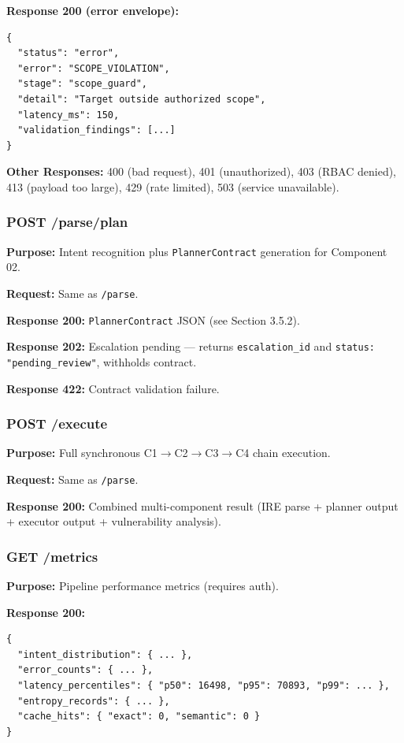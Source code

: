 ﻿\documentclass[10pt,journal,onecolumn]{IEEEtran}
\begin{document}
\textbf{Response 200 (error envelope):}
\begin{lstlisting}
{
  "status": "error",
  "error": "SCOPE_VIOLATION",
  "stage": "scope_guard",
  "detail": "Target outside authorized scope",
  "latency_ms": 150,
  "validation_findings": [...]
}
\end{lstlisting}

\textbf{Other Responses:} 400 (bad request), 401 (unauthorized), 403 (RBAC denied), 413 (payload too large), 429 (rate limited), 503 (service unavailable).

\subsubsection{POST /parse/plan}
\textbf{Purpose:} Intent recognition plus \texttt{PlannerContract} generation for Component 02.

\textbf{Request:} Same as \texttt{/parse}.

\textbf{Response 200:} \texttt{PlannerContract} JSON (see Section 3.5.2).

\textbf{Response 202:} Escalation pending --- returns \texttt{escalation\_id} and \texttt{status: "pending\_review"}, withholds contract.

\textbf{Response 422:} Contract validation failure.

\subsubsection{POST /execute}
\textbf{Purpose:} Full synchronous C1$\rightarrow$C2$\rightarrow$C3$\rightarrow$C4 chain execution.

\textbf{Request:} Same as \texttt{/parse}.

\textbf{Response 200:} Combined multi-component result (IRE parse + planner output + executor output + vulnerability analysis).

\subsubsection{GET /metrics}
\textbf{Purpose:} Pipeline performance metrics (requires auth).

\textbf{Response 200:}
\begin{lstlisting}
{
  "intent_distribution": { ... },
  "error_counts": { ... },
  "latency_percentiles": { "p50": 16498, "p95": 70893, "p99": ... },
  "entropy_records": { ... },
  "cache_hits": { "exact": 0, "semantic": 0 }
}
\end{lstlisting}
\end{document}
